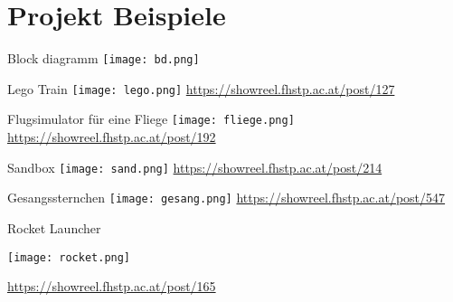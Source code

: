 \section{Projekt Beispiele}
 \frame{\sectionpage}

\begin{frame}{Block diagramm}
\texttt{[image: bd.png]}
\end{frame}


\begin{frame}{Lego Train}
\texttt{[image: lego.png]}
\url{https://showreel.fhstp.ac.at/post/127}
\end{frame}


\begin{frame}{Flugsimulator für eine Fliege}
\texttt{[image: fliege.png]}
\url{https://showreel.fhstp.ac.at/post/192}
\end{frame}

\begin{frame}{Sandbox}
\texttt{[image: sand.png]}
\url{https://showreel.fhstp.ac.at/post/214}
\end{frame}


\begin{frame}{Gesangssternchen}
\texttt{[image: gesang.png]}
\url{https://showreel.fhstp.ac.at/post/547}
\end{frame}

\begin{frame}{Rocket Launcher}

\texttt{[image: rocket.png]}

\url{https://showreel.fhstp.ac.at/post/165}
\end{frame}




